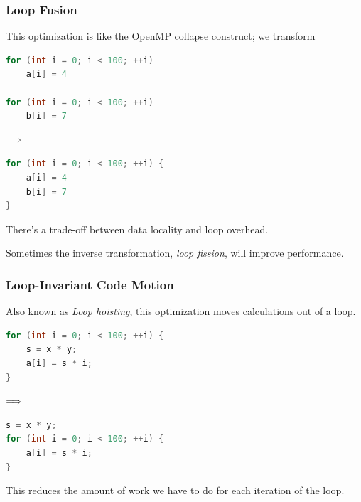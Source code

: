 \begin{frame}[fragile]
\frametitle{Loop Fusion}

This optimization is like the OpenMP collapse
construct; we transform
\begin{center}
\vspace*{-1em}
\begin{minipage}{.3\textwidth}
  \begin{lstlisting}[language=C]
for (int i = 0; i < 100; ++i)
    a[i] = 4

for (int i = 0; i < 100; ++i)
    b[i] = 7
  \end{lstlisting}
  \end{minipage} $\Longrightarrow \hspace*{2em}$ \begin{minipage}{.4\textwidth}
  \begin{lstlisting}[language=C]
for (int i = 0; i < 100; ++i) {
    a[i] = 4
    b[i] = 7
}
  \end{lstlisting}
  \end{minipage}
  \end{center}
There's a trade-off between data locality and loop overhead.

Sometimes the inverse transformation, \emph{loop fission}, will
improve performance.

\end{frame}

\begin{frame}[fragile]
\frametitle{Loop-Invariant Code Motion}

 Also known as \emph{Loop hoisting},
this optimization moves calculations out of a loop. 
\begin{center}
\vspace*{-1em}
\begin{minipage}{.3\textwidth}
  \begin{lstlisting}[language=C]
for (int i = 0; i < 100; ++i) {
    s = x * y;
    a[i] = s * i;
}
  \end{lstlisting}
  \end{minipage} $\Longrightarrow \hspace*{2em}$ \begin{minipage}{.4\textwidth}
  \begin{lstlisting}[language=C]
s = x * y;
for (int i = 0; i < 100; ++i) {
    a[i] = s * i;
}
  \end{lstlisting}
  \end{minipage}
  \end{center}

This reduces the amount of work we have to do for each iteration of the loop.

\end{frame}


